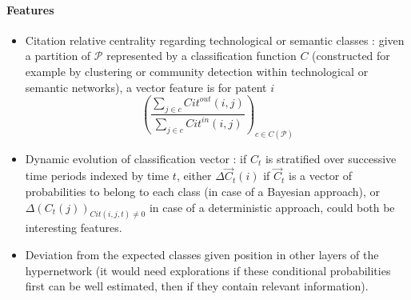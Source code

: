 




\paragraph{Features}


\begin{itemize}
\item Citation relative centrality regarding technological or semantic classes : given a partition of $\mathcal{P}$ represented by a classification function $C$ (constructed for example by clustering or community detection within technological or semantic networks), a vector feature is for patent $i$
\[
\left(\frac{\sum_{j\in c}Cit^{out}(i,j)}{\sum_{j\in c}Cit^{in}(i,j)}\right)_{c\in C(\mathcal{P})}
\]
\item Dynamic evolution of classification vector : if $C_t$ is stratified over successive time periods indexed by time $t$, either $\Delta \vec{C}_t (i)$ if $\vec{C}_t$ is a vector of probabilities to belong to each class (in case of a Bayesian approach), or $\Delta (C_t(j))_{Cit(i,j,t)\neq 0}$ in case of a deterministic approach, could both be interesting features.
\item Deviation from the expected classes given position in other layers of the hypernetwork (it would need explorations if these conditional probabilities first can be well estimated, then if they contain relevant information).
\end{itemize}

